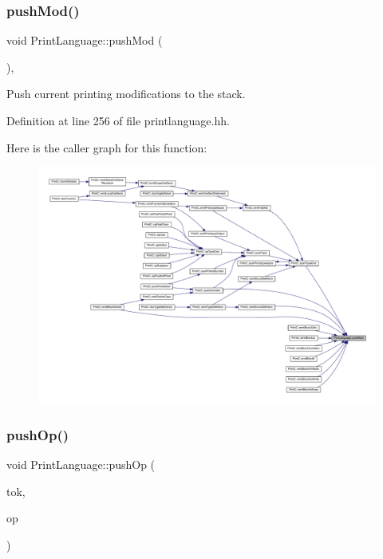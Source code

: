 \subsubsection{\texorpdfstring{pushMod()}{pushMod()}}
{\footnotesize\ttfamily void Print\+Language\+::push\+Mod (\begin{DoxyParamCaption}\item[{void}]{ }\end{DoxyParamCaption})\hspace{0.3cm}{\ttfamily [inline]}, {\ttfamily [protected]}}



Push current printing modifications to the stack. 



Definition at line 256 of file printlanguage.\+hh.

Here is the caller graph for this function\+:
\nopagebreak
\begin{figure}[H]
\begin{center}
\leavevmode
\includegraphics[width=350pt]{class_print_language_a68e2ed7abe5834cc7301925779e3fc34_icgraph}
\end{center}
\end{figure}
\mbox{\label{class_print_language_abe1affc823865f4379d27121c39e5880}} 
\subsubsection{\texorpdfstring{pushOp()}{pushOp()}}
{\footnotesize\ttfamily void Print\+Language\+::push\+Op (\begin{DoxyParamCaption}\item[{const \mbox{\hyperlink{class_op_token}{Op\+Token}} $\ast$}]{tok,  }\item[{const \mbox{\hyperlink{class_pcode_op}{Pcode\+Op}} $\ast$}]{op }\end{DoxyParamCaption})\hspace{0.3cm}{\ttfamily [protected]}}



